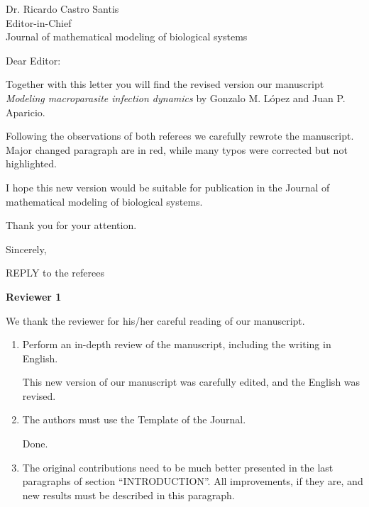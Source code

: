 \documentclass [12pt]{letter}
\begin{document}
\signature{Gonzalo Maximiliano López}
\address{Dr. Gonzalo Maximiliano López\\
 INENCO\\ Universidad Nacional de Salta\\
 4400 Salta, Argentina}

\begin{letter}{Dr. Ricardo Castro Santis\\ Editor-in-Chief \\ Journal of mathematical modeling of biological systems}



\opening{Dear Editor: }

Together with this letter you will find the revised version our manuscript {\it
Modeling macroparasite infection dynamics} by Gonzalo M. López and Juan P. Aparicio.

Following the observations of both referees we carefully rewrote the manuscript. Major changed paragraph are in red, while many typos were corrected but not highlighted.

I hope this new version would be suitable for publication in the Journal of mathematical modeling of biological systems.

Thank you for your attention.

\closing{Sincerely,}
\thispagestyle{empty}

\newpage
REPLY to the referees





\textbf{Reviewer 1}

We thank the reviewer for his/her careful reading of our manuscript.
	
\begin{enumerate}
		\item Perform an in-depth review of the manuscript, including the writing
		in English.
		
		This new version of our manuscript was carefully edited, and the
		English was revised.
		
		\item The authors must use the Template of the Journal.
		
		Done.
		
		\item The original contributions need to be much better presented in the
		last paragraphs of section ``INTRODUCTION”. All improvements, if they are, and new results must
		be described in this paragraph.
		

\end{enumerate}
\end{letter}
\end{document}
